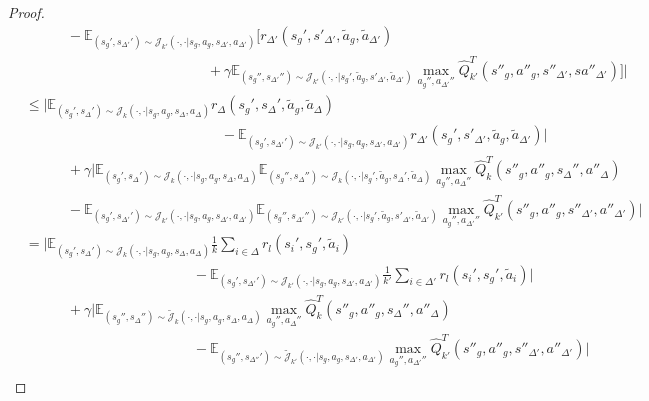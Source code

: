 \documentclass[10pt,a4paper]{amsart}
\def\E{\mathbb{E}}
\begin{document}
\begin{proof}
\begin{align*}
&\quad\quad\quad -\E_{(s_g',s_{\Delta'}')\sim{\mathcal{J}_{k'}(\cdot,\cdot|s_g,a_g,s_{\Delta'},a_{\Delta'})}}\bigg[r_{\Delta'}(s_g',s'_{\Delta'},\tilde{a}_g,\tilde{a}_{\Delta'})\\
&\quad\quad\quad\quad\quad\quad\quad\quad\quad\quad\quad\quad\quad+\gamma\E_{(s_g'',s_{\Delta'}'')\sim\mathcal{J}_{k'}(\cdot,\cdot|s_g',\tilde{a}_g,s'_{\Delta'},\tilde{a}_{\Delta'})}\max_{a_g'',a_{\Delta'}''}\hat{Q}_{k'}^{T}(s''_g, {a}''_g,s''_{\Delta'}, s{a}''_{\Delta'})\bigg]\bigg| \\
&\leq \bigg|\E_{(s_g',s_\Delta')\sim{\mathcal{J}_k(\cdot,\cdot|s_g,a_g,s_\Delta,a_\Delta)}} r_\Delta(s_g',s_\Delta',\tilde{a}_g,\tilde{a}_\Delta) \\
&\quad\quad\quad\quad\quad\quad\quad\quad\quad\quad\quad\quad\quad \quad - \E_{(s_g',s_{\Delta'}')\sim{\mathcal{J}_{k'}(\cdot,\cdot|s_g,a_g,s_{\Delta'},a_{\Delta'})}}r_{\Delta'}(s_g',s'_{\Delta'},\tilde{a}_g,\tilde{a}_{\Delta'})\bigg| \\
&\quad\quad\quad+ \gamma\bigg|\E_{(s_g',s_\Delta')\sim{\mathcal{J}_k(\cdot,\cdot|s_g,a_g,s_\Delta,a_\Delta)}}\E_{(s_g'',s_\Delta'')\sim\mathcal{J}_k(\cdot,\cdot|s_g',\tilde{a}_g,s_\Delta',\tilde{a}_\Delta)}\max_{a_g'',a_\Delta''}\hat{Q}_k^{T}(s''_g,{a}''_g,s_\Delta'',{a}''_\Delta) \\
&\quad\quad\quad- \E_{(s_g',s_{\Delta'}')\sim{\mathcal{J}_{k'}(\cdot,\cdot|s_g,a_g,s_{\Delta'},a_{\Delta'})}}\E_{(s_g'',s_{\Delta'}'')\sim\mathcal{J}_{k'}(\cdot,\cdot|s_g',\tilde{a}_g,s'_{\Delta'},\tilde{a}_{\Delta'})}\max_{a_g'',a_{\Delta'}''}\hat{Q}_{k'}^{T}(s''_g, {a}''_g,s''_{\Delta'}, {a}''_{\Delta'})\bigg| \\
&= \bigg|\E_{(s_g',s_\Delta')\sim{\mathcal{J}_k(\cdot,\cdot|s_g,a_g,s_\Delta,a_\Delta)}} \frac{1}{k}\sum_{i\in\Delta}r_l(s_i',s_g',\tilde{a}_i) \\
&\quad\quad\quad\quad\quad\quad\quad\quad\quad\quad\quad\quad- \E_{(s_g',s_{\Delta'}')\sim{\mathcal{J}_{k'}(\cdot,\cdot|s_g,a_g,s_{\Delta'},a_{\Delta'})}}\frac{1}{k'}\sum_{i\in\Delta'}r_l(s_i',s_g',\tilde{a}_i)\bigg| \\
&\quad\quad\quad+ \gamma\bigg|\E_{(s_g'',s_\Delta'')\sim{\tilde{\mathcal{J}}_k(\cdot,\cdot|s_g,a_g,s_\Delta,a_\Delta)}}\max_{a_g'',a_\Delta''}\hat{Q}_k^{T}(s''_g,{a}''_g,s_\Delta'',{a}''_\Delta) \\
&\quad\quad\quad\quad \quad\quad\quad \quad\quad\quad\quad \quad- \E_{(s_g'',s_{\Delta''}')\sim{\tilde{\mathcal{J}}_{k'}(\cdot,\cdot|s_g,a_g,s_{\Delta'},a_{\Delta'})}}\max_{a_g'',a_{\Delta'}''}\hat{Q}_{k'}^{T}(s''_g, {a}''_g,s''_{\Delta'}, {a}''_{\Delta'})\bigg| \\

\end{align*}
\end{proof}
\end{document}

